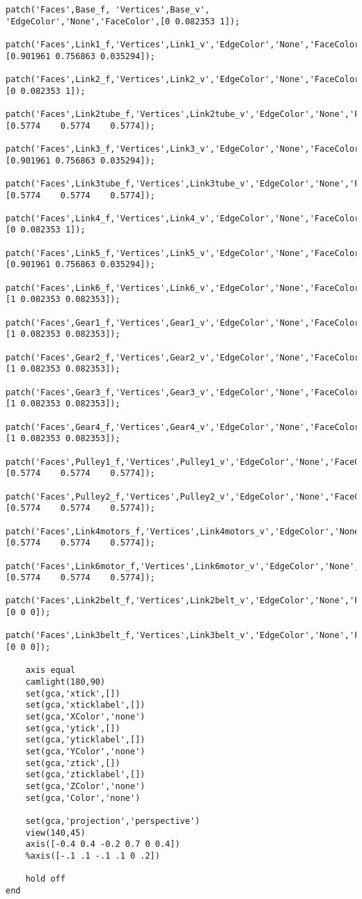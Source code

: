 \begin{lstlisting}[frame=lines,style=Matlab-editor,basicstyle = \mlttfamily, caption=MEIOSIS Drawing Function]
    patch('Faces',Base_f, 'Vertices',Base_v', 'EdgeColor','None','FaceColor',[0 0.082353 1]);
    patch('Faces',Link1_f,'Vertices',Link1_v','EdgeColor','None','FaceColor',[0.901961 0.756863 0.035294]);
    patch('Faces',Link2_f,'Vertices',Link2_v','EdgeColor','None','FaceColor',[0 0.082353 1]);
    patch('Faces',Link2tube_f,'Vertices',Link2tube_v','EdgeColor','None','FaceColor',[0.5774    0.5774    0.5774]);
    patch('Faces',Link3_f,'Vertices',Link3_v','EdgeColor','None','FaceColor',[0.901961 0.756863 0.035294]);
    patch('Faces',Link3tube_f,'Vertices',Link3tube_v','EdgeColor','None','FaceColor',[0.5774    0.5774    0.5774]);
    patch('Faces',Link4_f,'Vertices',Link4_v','EdgeColor','None','FaceColor',[0 0.082353 1]);
    patch('Faces',Link5_f,'Vertices',Link5_v','EdgeColor','None','FaceColor',[0.901961 0.756863 0.035294]);
    patch('Faces',Link6_f,'Vertices',Link6_v','EdgeColor','None','FaceColor',[1 0.082353 0.082353]);
    patch('Faces',Gear1_f,'Vertices',Gear1_v','EdgeColor','None','FaceColor',[1 0.082353 0.082353]);
    patch('Faces',Gear2_f,'Vertices',Gear2_v','EdgeColor','None','FaceColor',[1 0.082353 0.082353]);
    patch('Faces',Gear3_f,'Vertices',Gear3_v','EdgeColor','None','FaceColor',[1 0.082353 0.082353]);
    patch('Faces',Gear4_f,'Vertices',Gear4_v','EdgeColor','None','FaceColor',[1 0.082353 0.082353]);
    patch('Faces',Pulley1_f,'Vertices',Pulley1_v','EdgeColor','None','FaceColor',[0.5774    0.5774    0.5774]);
    patch('Faces',Pulley2_f,'Vertices',Pulley2_v','EdgeColor','None','FaceColor',[0.5774    0.5774    0.5774]);
    patch('Faces',Link4motors_f,'Vertices',Link4motors_v','EdgeColor','None','FaceColor',[0.5774    0.5774    0.5774]);
    patch('Faces',Link6motor_f,'Vertices',Link6motor_v','EdgeColor','None','FaceColor',[0.5774    0.5774    0.5774]);
    patch('Faces',Link2belt_f,'Vertices',Link2belt_v','EdgeColor','None','FaceColor',[0 0 0]);
    patch('Faces',Link3belt_f,'Vertices',Link3belt_v','EdgeColor','None','FaceColor',[0 0 0]);

    axis equal
    camlight(180,90)
    set(gca,'xtick',[])
    set(gca,'xticklabel',[])
    set(gca,'XColor','none')
    set(gca,'ytick',[])
    set(gca,'yticklabel',[])
    set(gca,'YColor','none')
    set(gca,'ztick',[])
    set(gca,'zticklabel',[])
    set(gca,'ZColor','none')
    set(gca,'Color','none')

    set(gca,'projection','perspective')
    view(140,45)
    axis([-0.4 0.4 -0.2 0.7 0 0.4])
    %axis([-.1 .1 -.1 .1 0 .2])

    hold off
end
\end{lstlisting}
